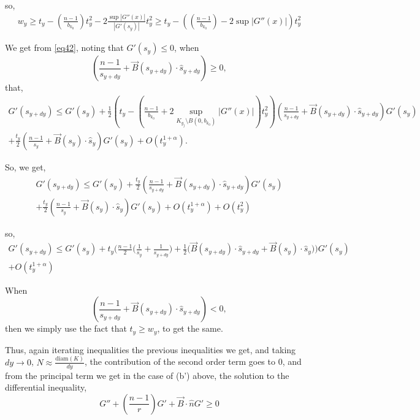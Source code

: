 \documentclass{article}
\theoremstyle{plain}
\theoremstyle{definition}
\theoremstyle{plain}
\begin{document}
\begin{itemize}
so, \begin{align}w_y \ge t_y - \left( \frac{n-1}{b_{k_0}} \right) t_y^2 - 2 \frac{\sup |G''(x)|}{|G'(s_y)|} t_y^2 \ge t_y - \left( \left( \frac{n-1}{b_{k_0}} \right) - 2 \sup |G''(x)| \right) t_y^2\end{align}


We get from \cref{eq42}, noting that $G'(s_y) \le 0$, when $$\left( \frac{n-1}{s_{y+dy}} + \vec{B}(s_{y+dy}) \cdot \hat{s}_{y+dy} \right) \ge 0,$$ that,
\begin{multline}
G'(s_{y+dy}) \le G'(s_y) + \frac{1}{2} \left( t_y - \left( \frac{n-1}{b_{k_0}} + 2 \sup_{K_{y_j} \setminus B(0, b_{k_0})} |G''(x)| \right) t_y^2 \right) \left( \frac{n-1}{s_{y+dy}} + \vec{B}(s_{y+dy}) \cdot \hat{s}_{y+dy} \right) G'(s_y) \\
+ \frac{t_y}{2} \left( \frac{n-1}{s_y} + \vec{B}(s_y) \cdot \hat{s}_y \right) G'(s_y) + O(t_y^{1+\alpha}).
\end{multline}

So, we get,
\begin{align}
G'(s_{y+dy}) \le G'(s_y) + \frac{t_y}{2} \left( \frac{n-1}{s_{y+dy}} + \vec{B}(s_{y+dy}) \cdot \hat{s}_{y+dy} \right) G'(s_y)\\ + \frac{t_y}{2} \left( \frac{n-1}{s_y} + \vec{B}(s_y) \cdot \hat{s}_y \right) G'(s_y) + O(t_y^{1+\alpha}) + O(t_y^2)
\end{align}

so, \begin{multline} \label{eqb'}
G'(s_{y+dy}) \le G'(s_y) + t_y \Bigg( \frac{n-1}{2} \Bigg( \frac{1}{s_y} + \frac{1}{s_{y+dy}} \Bigg)+\frac{1}{2} \Bigg( \vec{B}(s_{y+dy}) \cdot \hat{s}_{y+dy} + \vec{B}(s_y) \cdot \hat{s}_y \Bigg) \Bigg) G'(s_y) \\+ O(t_y^{1+\alpha})
\end{multline}

When $$\left( \frac{n-1}{s_{y+dy}} + \vec{B}(s_{y+dy}) \cdot \hat{s}_{y+dy} \right) < 0,$$ then we simply use the fact that $t_y \ge w_y$, to get the same.
\end{itemize}

Thus, again iterating inequalities the previous inequalities we get, and taking $dy \to 0$, $N \approx \frac{\text{diam}(K)}{dy}$, the contribution of the second order term goes to 0, and from the principal term we get in the case of (b') above, the solution to the differential inequality,
\begin{equation}
G'' + \left( \frac{n-1}{r} \right) G' + \vec{B} \cdot \hat{n} G' \ge 0
\end{equation}
\end{document}

